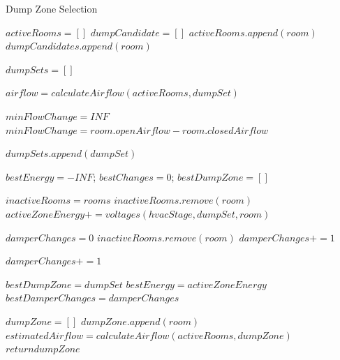 \begin{algorithm}[!htb]                      %
\caption{Dump Zone Selection}          %
\label{alg:dumpZoneSelection}%
\begin{algorithmic}                    %
\STATE $activeRooms = []$
\STATE $dumpCandidate = []$
\STATE $activeRooms.append(room)$
\ELSE
\STATE $dumpCandidates.append(room)$
\ENDIF
\ENDFOR

\STATE $dumpSets = []$


\STATE $airflow = calculateAirflow(activeRooms, dumpSet)$

\STATE $minFlowChange = INF$
\STATE $minFlowChange = room.openAirflow - room.closedAirflow$
\ENDIF
\ENDFOR

\STATE $dumpSets.append(dumpSet)$
\ENDIF

\ENDFOR

\STATE $bestEnergy = -INF$; $bestChanges = 0$; $bestDumpZone = []$

\STATE $inactiveRooms = rooms$
\STATE $inactiveRooms.remove(room)$
\STATE $activeZoneEnergy += voltages(hvacStage, dumpSet, room)$
\ENDFOR

\STATE $damperChanges = 0$
\STATE $inactiveRooms.remove(room)$
\STATE $damperChanges += 1$
\ENDIF
\ENDFOR

\STATE $damperChanges += 1$
\ENDIF
\ENDFOR

\STATE $bestDumpZone = dumpSet$
\STATE $bestEnergy = activeZoneEnergy$
\STATE $bestDamperChanges = damperChanges$
\ENDIF

\ENDFOR

\STATE $dumpZone = []$
\STATE $dumpZone.append(room)$
\STATE $estimatedAirflow = calculateAirflow(activeRooms, dumpZone)$
\STATE $return dumpZone$
\ENDIF
\ENDFOR

\end{algorithmic}
\end{algorithm}

